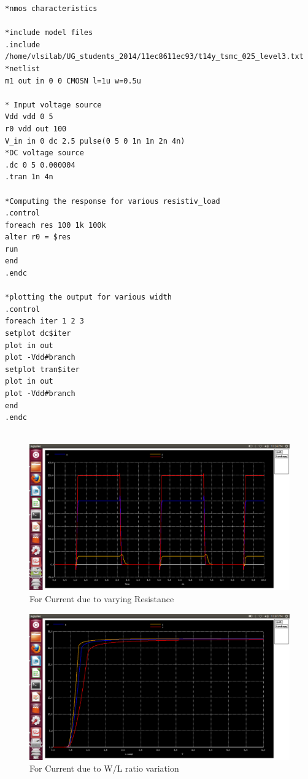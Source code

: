 \documentclass[12pt,a4paper]{article}
\begin{document}
\begin{center}
\begin{lstlisting}
*nmos characteristics

*include model files
.include /home/vlsilab/UG_students_2014/11ec8611ec93/t14y_tsmc_025_level3.txt
*netlist
m1 out in 0 0 CMOSN l=1u w=0.5u

* Input voltage source
Vdd vdd 0 5
r0 vdd out 100
V_in in 0 dc 2.5 pulse(0 5 0 1n 1n 2n 4n)
*DC voltage source
.dc 0 5 0.000004
.tran 1n 4n

*Computing the response for various resistiv_load
.control
foreach res 100 1k 100k
alter r0 = $res
run 
end
.endc

*plotting the output for various width
.control
foreach iter 1 2 3
setplot dc$iter
plot in out
plot -Vdd#branch
setplot tran$iter
plot in out
plot -Vdd#branch
end
.endc


\end{lstlisting}

\begin{figure}[!ht]
\centering
\includegraphics[scale=0.37]{lab2_current_dueto_varingR.png}
\caption[Short]{For Current due to varying Resistance}
\end{figure}
\clearpage
\begin{figure}[!ht]
\centering
\includegraphics[scale=0.37]{lab2_DCeffect_on_current_dueto_WbyL_vary.png}
\caption[Short]{For Current due to W/L ratio variation}
\end{figure}



\end{center}
\end{document}
